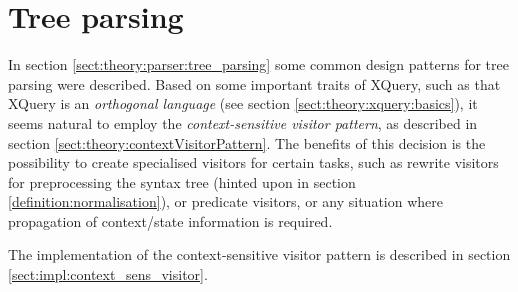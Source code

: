 \section{Tree parsing}
\label{sect:method:tree_parsing}
In section \ref{sect:theory:parser:tree_parsing} some common design patterns
for tree parsing were described. Based on some important traits of XQuery, such
as that XQuery is an \textit{orthogonal language} (see section
\ref{sect:theory:xquery:basics}), it seems natural to employ the
\textit{context-sensitive visitor pattern}, as described in section
\ref{sect:theory:contextVisitorPattern}. The benefits of this decision is the
possibility to create specialised visitors for certain tasks, such as rewrite
visitors for preprocessing the syntax tree (hinted upon in section
\ref{definition:normalisation}), or predicate visitors, or any situation where
propagation of context/state information is required.

The implementation of the context-sensitive visitor pattern is described in
section \ref{sect:impl:context_sens_visitor}. 
